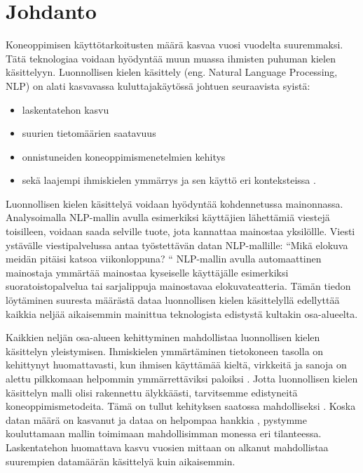 \chapter{Johdanto\label{intro}}

Koneoppimisen käyttötarkoitusten määrä kasvaa vuosi vuodelta suuremmaksi. Tätä teknologiaa voidaan hyödyntää muun muassa ihmisten puhuman kielen käsittelyyn. Luonnollisen kielen käsittely (eng. Natural Language Processing, NLP) on alati kasvavassa kuluttajakäytössä johtuen seuraavista syistä:
\begin{itemize}
  \item laskentatehon kasvu
  \item suurien tietomäärien saatavuus
  \item onnistuneiden koneoppimismenetelmien kehitys
  \item sekä laajempi ihmiskielen ymmärrys ja sen käyttö eri konteksteissa \citep{doi:10.1126/science.aaa8685}.
\end{itemize}

Luonnollisen kielen käsittelyä voidaan hyödyntää kohdennetussa mainonnassa. Analysoimalla NLP-mallin avulla esimerkiksi käyttäjien lähettämiä viestejä toisilleen, voidaan saada selville tuote, jota kannattaa mainostaa yksilöllle. Viesti ystävälle viestipalvelussa antaa työstettävän datan NLP-mallille: ``Mikä elokuva meidän pitäisi katsoa viikonloppuna? `` NLP-mallin avulla automaattinen mainostaja ymmärtää mainostaa kyseiselle käyttäjälle esimerkiksi suoratoistopalvelua tai sarjalippuja mainostavaa elokuvateatteria. Tämän tiedon löytäminen suuresta määrästä dataa luonnollisen kielen käsittelyllä edellyttää kaikkia neljää aikaisemmin mainittua teknologista edistystä kultakin osa-alueelta.

Kaikkien neljän osa-alueen kehittyminen mahdollistaa luonnollisen kielen käsittelyn yleistymisen. Ihmiskielen ymmärtäminen tietokoneen tasolla on kehittynyt huomattavasti, kun ihmisen käyttämää kieltä, virkkeitä ja sanoja on alettu pilkkomaan helpommin ymmärrettäviksi paloiksi \citep{https://doi.org/10.1002/aris.1440370103}. Jotta luonnollisen kielen käsittelyn malli olisi rakennettu älykkäästi, tarvitsemme edistyneitä koneoppimismetodeita. Tämä on tullut kehityksen saatossa mahdolliseksi \citep{jordan2015machine}. Koska datan määrä on kasvanut ja dataa on helpompaa hankkia \citep{gopalakrishnan2018deep}, pystymme kouluttamaan mallin toimimaan mahdollisimman monessa eri tilanteessa. Laskentatehon huomattava kasvu vuosien mittaan \citep{moore1965cramming} on alkanut mahdollistaa suurempien datamäärän käsittelyä kuin aikaisemmin.


